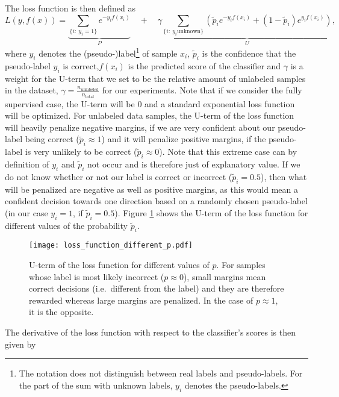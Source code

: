 The loss function is then defined as
\begin{equation*}
L(y,f(x)) = \underbrace{\sum_{\{i :~ y_i = 1\}} e^{-y_i f(x_i)}}_{P} \quad + \quad \gamma\underbrace{\sum_{\{i:~ y_i \text{unknown}\}} \left( \tilde p_i e^{-y_i f(x_i)} + (1-\tilde p_i) e^{y_i f(x_i)}\right)}_{U}, 
\end{equation*}
where $y_i$ denotes the (pseudo-)label\footnote{The notation does not distinguish between real labels and pseudo-labels. For the part of the sum with unknown labels, $y_i$ denotes the pseudo-labels.} of sample $x_i$, $\tilde p_i$ is the confidence that the pseudo-label $y_i$ is correct,$f(x_i)$ is the predicted score of the classifier and $\gamma$ is a weight for the U-term that we set to be the relative amount of unlabeled samples in the dataset, $\gamma = \frac{n_{\text{unlabeled}}}{n_{\text{total}}}$ for our experiments. 
Note that if we consider the fully supervised case, the U-term will be 0 and a standard exponential loss function will be optimized. 
For unlabeled data samples, the U-term of the loss function will heavily penalize negative margins, if we are very confident about our pseudo-label being correct ($\tilde p_i \approx 1$) and it will penalize positive margins, if the pseudo-label is very unlikely to be correct ($\tilde p_i \approx 0$). 
Note that this extreme case can by definition of $y_i$ and $\tilde p_i$ not occur and is therefore just of explanatory value. 
If we do not know whether or not our label is correct or incorrect ($\tilde p_i = 0.5$), then what will be penalized are negative as well as positive margins, as this would mean a confident decision towards one direction based on a randomly chosen pseudo-label (in our case $y_i = 1$, if $\tilde p_i=0.5$). Figure \ref{fig:ourlossfunctionplot} shows the U-term of the loss function for different values of the probability $\tilde p_i$.

\begin{figure}[ht]
  \centering
  \texttt{[image: loss\_function\_different\_p.pdf]}	
  \caption{U-term of the loss function for different values of $p$. For samples whose label is most likely incorrect ($p \approx 0$), small margins mean correct decisions (i.e.\ different from the label) and they are therefore rewarded whereas large margins are penalized. In the case of $p \approx 1$, it is the opposite.}
  \label{fig:ourlossfunctionplot}
\end{figure}

The derivative of the loss function with respect to the classifier's scores is then given by 

